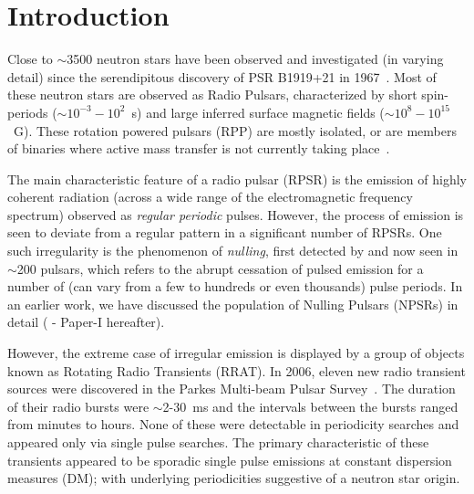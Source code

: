\documentclass{jaa}
\begin{document}

\artcitid{\#\#\#\#}
\setcounter{page}{1}


%
\section{Introduction}
%
Close to $\sim$3500 neutron stars  have been observed and investigated
(in varying detail) since the  serendipitous discovery of PSR B1919+21
in 1967~\cite{hewis68}.  Most  of these neutron stars  are observed as
Radio Pulsars,  characterized by  short spin-periods ($\sim  10^{-3} -
10^2$~s)  and large  inferred surface  magnetic fields  ($\sim 10^8  -
10^{15}$~G). These rotation powered pulsars (RPP) are mostly isolated,
or are members of binaries where active mass transfer is not currently
taking place~\cite{kaspi10,konar13,konar16c,konar17e}.

The  main characteristic  feature  of  a radio  pulsar  (RPSR) is  the
emission  of highly  coherent radiation  (across a  wide range  of the
electromagnetic frequency spectrum) observed as {\em regular periodic}
pulses. However,  the process of  emission is  seen to deviate  from a
regular  pattern  in   a  significant  number  of   RPSRs.   One  such
irregularity is  the phenomenon  of {\em  nulling}, first  detected by
 and now seen in $\sim$200 pulsars, which refers to the
abrupt cessation of  pulsed emission for a number of  (can vary from a
few to hundreds or even thousands)  pulse periods. In an earlier work,
we have discussed the population  of Nulling Pulsars (NPSRs) in detail
( - Paper-I hereafter).

However,  the extreme  case of  irregular emission  is displayed  by a
group of objects  known as Rotating Radio Transients  (RRAT). In 2006,
eleven  new radio  transient  sources were  discovered  in the  Parkes
Multi-beam Pulsar Survey~\cite{mclau06}.  The  duration of their radio
bursts were $\sim$2-30~ms and the  intervals between the bursts ranged
from minutes to  hours.  None of these were  detectable in periodicity
searches and  appeared only  via single  pulse searches.   The primary
characteristic  of these  transients  appeared to  be sporadic  single
pulse emissions at constant  dispersion measures (DM); with underlying
periodicities suggestive of a neutron star origin.
\end{document}
